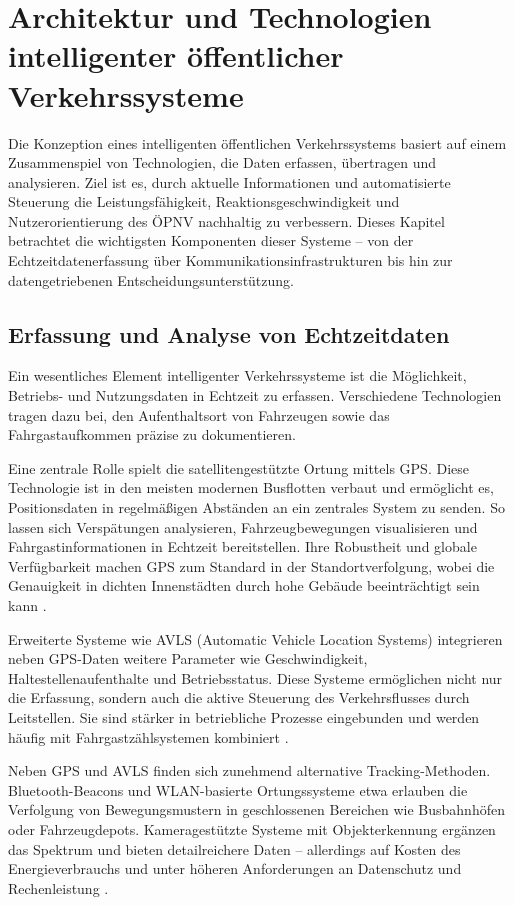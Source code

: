 \section{Architektur und Technologien intelligenter öffentlicher Verkehrssysteme}

Die Konzeption eines intelligenten öffentlichen Verkehrssystems basiert auf einem Zusammenspiel von Technologien, die Daten erfassen, übertragen und analysieren. Ziel ist es, durch aktuelle Informationen und automatisierte Steuerung die Leistungsfähigkeit, Reaktionsgeschwindigkeit und Nutzerorientierung des ÖPNV nachhaltig zu verbessern. Dieses Kapitel betrachtet die wichtigsten Komponenten dieser Systeme – von der Echtzeitdatenerfassung über Kommunikationsinfrastrukturen bis hin zur datengetriebenen Entscheidungsunterstützung.

\subsection{Erfassung und Analyse von Echtzeitdaten}

Ein wesentliches Element intelligenter Verkehrssysteme ist die Möglichkeit, Betriebs- und Nutzungsdaten in Echtzeit zu erfassen. Verschiedene Technologien tragen dazu bei, den Aufenthaltsort von Fahrzeugen sowie das Fahrgastaufkommen präzise zu dokumentieren.

Eine zentrale Rolle spielt die satellitengestützte Ortung mittels GPS. Diese Technologie ist in den meisten modernen Busflotten verbaut und ermöglicht es, Positionsdaten in regelmäßigen Abständen an ein zentrales System zu senden. So lassen sich Verspätungen analysieren, Fahrzeugbewegungen visualisieren und Fahrgastinformationen in Echtzeit bereitstellen. Ihre Robustheit und globale Verfügbarkeit machen GPS zum Standard in der Standortverfolgung, wobei die Genauigkeit in dichten Innenstädten durch hohe Gebäude beeinträchtigt sein kann \cite{Taparia2021}.

Erweiterte Systeme wie AVLS (Automatic Vehicle Location Systems) integrieren neben GPS-Daten weitere Parameter wie Geschwindigkeit, Haltestellenaufenthalte und Betriebsstatus. Diese Systeme ermöglichen nicht nur die Erfassung, sondern auch die aktive Steuerung des Verkehrsflusses durch Leitstellen. Sie sind stärker in betriebliche Prozesse eingebunden und werden häufig mit Fahrgastzählsystemen kombiniert \cite{Luo2019}.

Neben GPS und AVLS finden sich zunehmend alternative Tracking-Methoden. Bluetooth-Beacons und WLAN-basierte Ortungssysteme etwa erlauben die Verfolgung von Bewegungsmustern in geschlossenen Bereichen wie Busbahnhöfen oder Fahrzeugdepots. Kameragestützte Systeme mit Objekterkennung ergänzen das Spektrum und bieten detailreichere Daten – allerdings auf Kosten des Energieverbrauchs und unter höheren Anforderungen an Datenschutz und Rechenleistung \cite{Elkosantini2013}.

